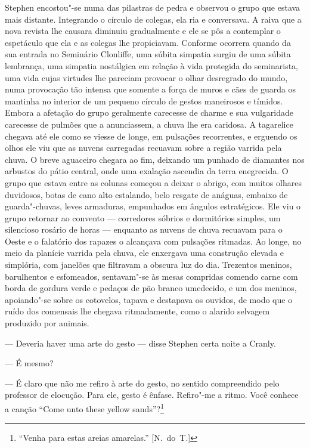 Stephen encostou"-se numa das pilastras de pedra e observou o grupo que estava
mais distante.  Integrando o círculo de colegas, ela ria e conversava.  A raiva
que a nova revista lhe causara diminuiu gradualmente e ele se pôs a contemplar
o espetáculo que ela e as colegas lhe propiciavam.  Conforme ocorrera quando da
sua entrada no Seminário Clonliffe, uma \label{subita"-simpatia} súbita simpatia surgiu de uma súbita
lembrança, uma simpatia nostálgica em relação à vida protegida do
seminarista, uma vida cujas virtudes lhe pareciam provocar o olhar desregrado
do mundo, numa provocação tão intensa que somente a força de muros e cães de
guarda os mantinha no interior de um pequeno círculo de gestos maneirosos e
tímidos.  Embora a afetação do grupo geralmente carecesse de charme e sua
vulgaridade carecesse de pulmões que a anunciassem, a chuva lhe era caridosa.
A tagarelice chegava até ele como se viesse de longe, em pulsações recorrentes,
e erguendo os olhos ele viu que as nuvens carregadas recuavam sobre a região
varrida pela chuva.  O breve aguaceiro chegara ao fim, deixando um punhado de
diamantes nos arbustos do pátio central, onde uma exalação ascendia da terra
enegrecida.  O grupo que estava entre as colunas começou a deixar o abrigo, com
muitos olhares duvidosos, botas de cano alto estalando, belo resgate de
anáguas, embaixo de guarda"-chuvas, leves armaduras, empunhados em ângulos
estratégicos.  Ele viu o grupo retornar ao convento --- corredores sóbrios e
dormitórios simples, um silencioso rosário de horas --- enquanto as nuvens de
chuva recuavam para o Oeste e o falatório dos rapazes o alcançava com pulsações
ritmadas.  Ao longe, no meio da planície varrida pela chuva, ele enxergava uma
construção elevada e simplória, com janelões que filtravam a obscura luz do
dia.  Trezentos meninos, barulhentos e esfomeados, sentavam"-se às mesas
compridas comendo carne com borda de gordura verde e pedaços de pão branco
umedecido, e um dos meninos, apoiando"-se sobre os cotovelos, tapava e destapava
os ouvidos, de modo que o ruído dos comensais lhe chegava ritmadamente, como o
alarido selvagem produzido por animais.

--- Deveria haver uma arte do gesto --- disse Stephen certa noite a Cranly.

--- É mesmo?

--- É claro que não me refiro à arte do gesto, no sentido compreendido pelo
professor de elocução.  Para ele, gesto é ênfase.  Refiro"-me a ritmo.  Você
conhece a canção “Come unto these yellow sands”?\footnote{ “Venha para
estas areias amarelas.” [N.~do~T.]}

